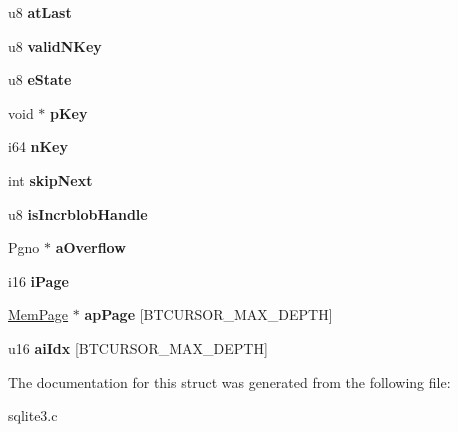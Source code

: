 \begin{DoxyCompactItemize}
\item 
\hypertarget{struct_bt_cursor_afff41eb594a5fc2c20b13232e6ff9689}{u8 {\bfseries at\-Last}}\label{struct_bt_cursor_afff41eb594a5fc2c20b13232e6ff9689}

\item 
\hypertarget{struct_bt_cursor_a7b64ef18751d3076484903e9e9e05098}{u8 {\bfseries valid\-N\-Key}}\label{struct_bt_cursor_a7b64ef18751d3076484903e9e9e05098}

\item 
\hypertarget{struct_bt_cursor_a30ab5e7109965b34a08562a7b7e6de15}{u8 {\bfseries e\-State}}\label{struct_bt_cursor_a30ab5e7109965b34a08562a7b7e6de15}

\item 
\hypertarget{struct_bt_cursor_a3c979824f27f63678d7a2b02311bc330}{void $\ast$ {\bfseries p\-Key}}\label{struct_bt_cursor_a3c979824f27f63678d7a2b02311bc330}

\item 
\hypertarget{struct_bt_cursor_a23f6a271258c109aaeda0ba19e808f92}{i64 {\bfseries n\-Key}}\label{struct_bt_cursor_a23f6a271258c109aaeda0ba19e808f92}

\item 
\hypertarget{struct_bt_cursor_ab1dfdbd6c9ec6cdb21cdb5deaa6d5ecb}{int {\bfseries skip\-Next}}\label{struct_bt_cursor_ab1dfdbd6c9ec6cdb21cdb5deaa6d5ecb}

\item 
\hypertarget{struct_bt_cursor_a539dc1beff0ec303cfd4c94c274c7a9b}{u8 {\bfseries is\-Incrblob\-Handle}}\label{struct_bt_cursor_a539dc1beff0ec303cfd4c94c274c7a9b}

\item 
\hypertarget{struct_bt_cursor_ae2dbcc15e63d349774a7ad6caef4d096}{Pgno $\ast$ {\bfseries a\-Overflow}}\label{struct_bt_cursor_ae2dbcc15e63d349774a7ad6caef4d096}

\item 
\hypertarget{struct_bt_cursor_ad4362a71baf655b0957a02324586853b}{i16 {\bfseries i\-Page}}\label{struct_bt_cursor_ad4362a71baf655b0957a02324586853b}

\item 
\hypertarget{struct_bt_cursor_ad3414d944f9578e86e26c6158f92096b}{\hyperlink{struct_mem_page}{Mem\-Page} $\ast$ {\bfseries ap\-Page} \mbox{[}B\-T\-C\-U\-R\-S\-O\-R\-\_\-\-M\-A\-X\-\_\-\-D\-E\-P\-T\-H\mbox{]}}\label{struct_bt_cursor_ad3414d944f9578e86e26c6158f92096b}

\item 
\hypertarget{struct_bt_cursor_a037a739198de5bee22ca203d34e90af1}{u16 {\bfseries ai\-Idx} \mbox{[}B\-T\-C\-U\-R\-S\-O\-R\-\_\-\-M\-A\-X\-\_\-\-D\-E\-P\-T\-H\mbox{]}}\label{struct_bt_cursor_a037a739198de5bee22ca203d34e90af1}

\end{DoxyCompactItemize}


The documentation for this struct was generated from the following file\-:\begin{DoxyCompactItemize}
\item 
sqlite3.\-c\end{DoxyCompactItemize}

